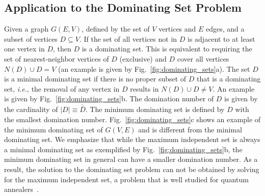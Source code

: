\documentclass[fleqn,10pt]{wlscirep}
\begin{document}
\subsection{Application to the Dominating Set Problem}
\label{sec:results:mds}

Given a graph $G(E,V)$, defined by the set of $V$ vertices and $E$ edges, and a subset of vertices $D \subseteq V$. If the set of all vertices not in $D$ is adjacent to at least one vertex in $D$, then $D$ is a dominating set. This is equivalent to requiring the set of nearest-neighbor vertices of $D$ (exclusive) and $D$ cover all vertices $N(D) \cup D = V$ (an example is given by Fig.~\ref{fig:dominating_sets}a). The set $D$ is a minimal dominating set if there is no proper subset of $D$ that is a dominating set, {\it{i.e.}}, the removal of any vertex in $D$ results in $N(D) \cup D  \neq V$. An example is given by Fig.~\ref{fig:dominating_sets}b. The domination number of $D$ is given by the cardinality of $|D| \equiv \overline{\overline{D}}$. The minimum dominating set is defined by $D$ with the smallest domination number. Fig.~\ref{fig:dominating_sets}c shows an example of the minimum dominating set of $G(V, E)$ and is different from the minimal dominating set. We emphasize that while the maximum independent set is always a minimal dominating set as exemplified by Fig.~\ref{fig:dominating_sets}b, the minimum dominating set in general can have a smaller domination number. As a result, the solution to the dominating set problem can not be obtained by solving for the maximum independent set, a problem that is well studied for quantum annealers~\cite{}.
\end{document}
